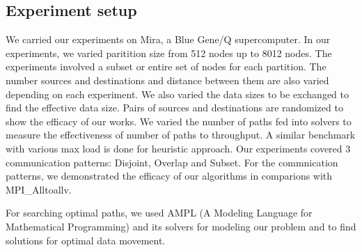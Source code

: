 \subsection{Experiment setup}

We carried our experiments on Mira, a Blue Gene/Q supercomputer. In our experiments, we varied paritition size from 512 nodes up to 8012 nodes. The experiments involved a subset or entire set of nodes for each partition. The number sources and destinations and distance between them are also varied depending on each experiment. We also varied the data sizes to be exchanged to find the effective data size. Pairs of sources and destinations are randomized to show the efficacy of our works. We varied the number of paths fed into solvers to measure the effectiveness of number of paths to throughput. A similar benchmark with various max load is done for heuristic approach. Our experiments covered 3 communication patterns: Disjoint, Overlap and Subset. For the commnication patterns, we demonstrated the efficacy of our algorithms in comparions with MPI\_Alltoallv.

For searching optimal paths, we used AMPL (A Modeling Language for Mathematical Programming) and its solvers \cite{AMPL} for modeling our problem and to find solutions for optimal data movement.
